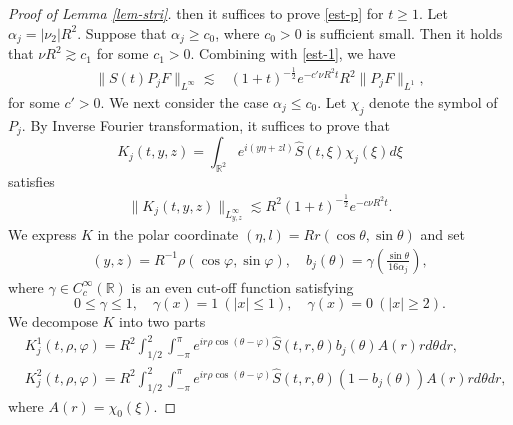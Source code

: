 \documentclass[12pt]{article}
\numberwithin{equation}{section}
\begin{document}
\begin{proof}[Proof of Lemma \ref{lem-stri}]
        then it suffices to prove \eqref{est-p} for $t \geqslant1$.
    Let $\alpha_j=|\nu_2|R^2$. Suppose that $\alpha_j\geq c_0$, where $c_0>0$ is sufficient small. Then it holds that $\nu R^2\gtrsim c_1$ for some $c_1>0$. Combining with \eqref{est-1}, we have
  		\begin{align*}
  			\|S(t)P_jF\|_{L^{\infty}}\lesssim&  (1+t)^{-\frac{1}{2}} e^{-c'\nu R^2 t}R^2\|P_j F\|_{L^1},
  		\end{align*}
        for some $c'>0$. We next consider the case $\alpha_j\leq c_0$. Let $\chi_j$ denote the symbol of $P_j$. By Inverse Fourier transformation, it suffices to prove that
  		\begin{equation*}
  			K_j(t,y,z)=\int_{\mathbb{R}^2} e^{i(y\eta+zl)}\hat{S}(t,\xi)\chi_j(\xi) d\xi
  		\end{equation*} 
  		satisfies
  		\begin{align*}
  			\|K_j(t,y,z)\|_{L^\infty_{y,z}}\lesssim R^2 (1+t)^{-\frac{1}{2}} e^{- c\nu R^2 t}.
  		\end{align*}
        We express $K$ in the polar coordinate  $(\eta,l)=Rr(\cos\theta,\sin\theta)$ and set
  		 \begin{align*}
  		 	(y,z)=R^{-1}\rho(\cos\varphi,\sin\varphi),\quad b_j(\theta)=\gamma\left(\frac{\sin\theta}{16\alpha_j}\right),
  		 \end{align*}
  		 where $\gamma\in C_c^{\infty}(\mathbb{R})$ is an even cut-off function satisfying
  		 \begin{equation*}
  		 	0\leq\gamma\leq1,\quad\gamma(x)=1\ (|x|\leq1),\quad \gamma(x)=0\ (|x|\geq2).
  		 \end{equation*} 
  	We decompose $K$ into two parts
  	\begin{align*}
  		&K_j^1(t,\rho,\varphi)=R^2\int_{1/2}^2\int_{-\pi}^{\pi}e^{ir\rho\cos(\theta-\varphi)}\hat{S}(t, r,\theta)b_j(\theta)A(r)r d \theta d r,\\
  		&K_j^2(t,\rho,\varphi)=R^2\int_{1/2}^2\int_{-\pi}^{\pi}e^{ir\rho\cos(\theta-\varphi)}\hat{S}(t,r,\theta)(1-b_j(\theta))A(r)r d \theta d r,
  	\end{align*}
  	where \(A(r)=\chi_0(\xi)\).

\end{proof}
\end{document}
